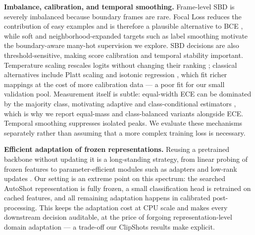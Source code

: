 \textbf{Imbalance, calibration, and temporal smoothing.} Frame-level SBD is severely imbalanced because boundary frames are rare. Focal Loss reduces the contribution of easy examples and is therefore a plausible alternative to BCE \cite{lin2017focal}, while soft and neighborhood-expanded targets such as label smoothing \cite{muller2019label} motivate the boundary-aware many-hot supervision we explore. SBD decisions are also threshold-sensitive, making score calibration and temporal stability important. Temperature scaling rescales logits without changing their ranking \cite{guo2017calibration}; classical alternatives include Platt scaling \cite{platt1999probabilistic} and isotonic regression \cite{zadrozny2002transforming}, which fit richer mappings at the cost of more calibration data --- a poor fit for our small validation pool. Measurement itself is subtle: equal-width ECE can be dominated by the majority class, motivating adaptive and class-conditional estimators \cite{nixon2019measuring}, which is why we report equal-mass and class-balanced variants alongside ECE. Temporal smoothing suppresses isolated peaks. We evaluate these mechanisms separately rather than assuming that a more complex training loss is necessary.

\textbf{Efficient adaptation of frozen representations.} Reusing a pretrained backbone without updating it is a long-standing strategy, from linear probing of frozen features to parameter-efficient modules such as adapters \cite{houlsby2019parameter} and low-rank updates \cite{hu2022lora}. Our setting is an extreme point on this spectrum: the searched AutoShot representation is fully frozen, a small classification head is retrained on cached features, and all remaining adaptation happens in calibrated post-processing. This keeps the adaptation cost at CPU scale and makes every downstream decision auditable, at the price of forgoing representation-level domain adaptation --- a trade-off our ClipShots results make explicit.

